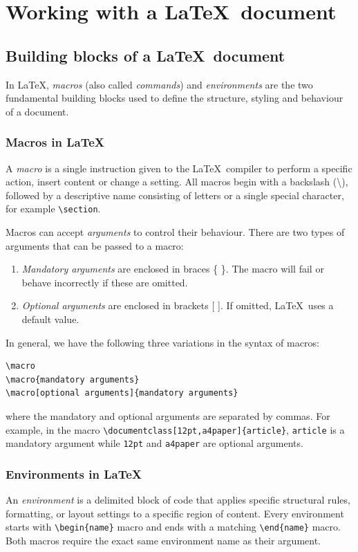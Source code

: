 \section{Working with a \LaTeX\ document}
	\subsection{Building blocks of a \LaTeX\ document}
		In \LaTeX, \emph{macros} (also called \emph{commands}) and \emph{environments} are the two fundamental building blocks used to define the structure, styling and behaviour of a document.
		
		\subsubsection{Macros in \LaTeX}
			A \emph{macro} is a single instruction given to the \LaTeX\ compiler to perform a specific action, insert content or change a setting. All macros begin with a backslash (\textbackslash), followed by a descriptive name consisting of letters or a single special character, for example \lstinline|\section|.
			
			Macros can accept \emph{arguments} to control their behaviour. There are two types of arguments that can be passed to a macro:
			\begin{enumerate}
				\item \emph{Mandatory arguments} are enclosed in braces \{ \}. The macro will fail or behave incorrectly if these are omitted.
				
				\item \emph{Optional arguments} are enclosed in brackets [ ]. If omitted, \LaTeX\ uses a default value.
			\end{enumerate}
			
			In general, we have the following three variations in the syntax of macros:
\begin{lstlisting}
\macro
\macro{mandatory arguments}
\macro[optional arguments]{mandatory arguments}
\end{lstlisting}
			where the mandatory and optional arguments are separated by commas. For example, in the macro \lstinline|\documentclass[12pt,a4paper]{article}|, \verb|article| is a mandatory argument while \verb|12pt| and \verb|a4paper| are optional arguments.
			
		\subsubsection{Environments in \LaTeX}
			An \emph{environment} is a delimited block of code that applies specific structural rules, formatting, or layout settings to a specific region of content. Every environment starts with \lstinline|\begin{name}| macro and ends with a matching \lstinline|\end{name}| macro. Both macros require the exact same environment name as their argument.
			
